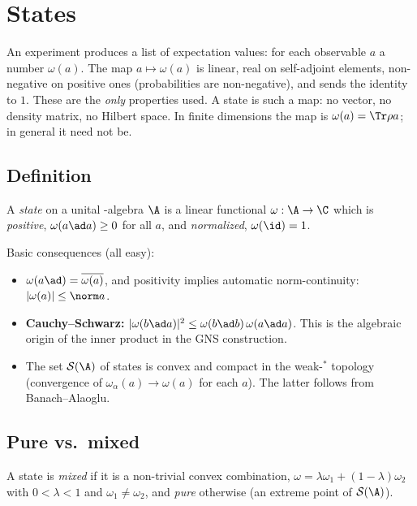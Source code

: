\chapter{States}\label{ch:states}

\begin{physmotiv}
An experiment produces a list of expectation values: for each observable $a$ a number $\omega(a)$. The map $a\mapsto\omega(a)$ is linear, real on self-adjoint elements, non-negative on positive ones (probabilities are non-negative), and sends the identity to $1$. These are the \emph{only} properties used. A state is such a map: no vector, no density matrix, no Hilbert space. In finite dimensions the map is $\omega(a)=\Tr\rho a$; in general it need not be.
\end{physmotiv}

\section{Definition}

\begin{definition}
A \emph{state} on a unital \cstar-algebra $\A$ is a linear functional $\omega:\A\to\C$ which is \emph{positive}, $\omega(a\ad a)\ge0$ for all $a$, and \emph{normalized}, $\omega(\id)=1$.
\end{definition}

Basic consequences (all easy):
\begin{itemize}
\item $\omega(a\ad)=\overline{\omega(a)}$, and positivity implies automatic norm-continuity: $|\omega(a)|\le\norm a$.
\item \textbf{Cauchy--Schwarz:} $|\omega(b\ad a)|^2\le\omega(b\ad b)\,\omega(a\ad a)$. This is the algebraic origin of the inner product in the GNS construction.
\item The set $\mathcal S(\A)$ of states is convex and compact in the weak-$^*$ topology (convergence of $\omega_\alpha(a)\to\omega(a)$ for each $a$). The latter follows from Banach--Alaoglu.
\end{itemize}

\section{Pure vs.\ mixed}

A state is \emph{mixed} if it is a non-trivial convex combination, $\omega=\lambda\omega_1+(1-\lambda)\omega_2$ with $0<\lambda<1$ and $\omega_1\ne\omega_2$, and \emph{pure} otherwise (an extreme point of $\mathcal S(\A)$).

